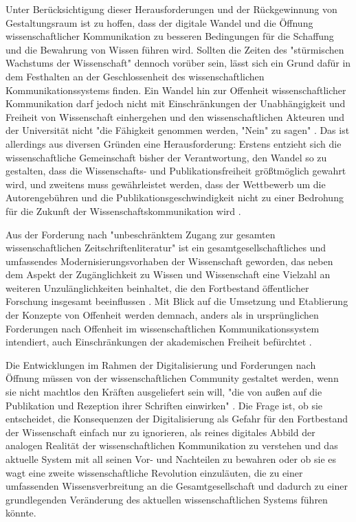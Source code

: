 Unter Berücksichtigung dieser Herausforderungen und der Rückgewinnung von Gestaltungsraum ist zu hoffen, dass der digitale Wandel und die Öffnung wissenschaftlicher Kommunikation zu besseren Bedingungen für die Schaffung und die Bewahrung von Wissen führen wird. Sollten die Zeiten des "stürmischen Wachstums der Wissenschaft" \cite{Koelbel_2002} dennoch vorüber sein, lässt sich ein Grund dafür in dem Festhalten an der Geschlossenheit des wissenschaftlichen Kommunikationssystems finden. Ein Wandel hin zur Offenheit wissenschaftlicher Kommunikation darf jedoch nicht mit Einschränkungen der Unabhängigkeit und Freiheit von Wissenschaft einhergehen und den wissenschaftlichen Akteuren und der Universität nicht "die Fähigkeit genommen werden, "Nein" zu sagen" \cite[:12]{Neidhardt_2006}. Das ist allerdings aus diversen Gründen eine Herausforderung: Erstens entzieht sich die wissenschaftliche Gemeinschaft bisher der Verantwortung, den Wandel so zu gestalten, dass die Wissenschafts- und Publikationsfreiheit größtmöglich gewahrt wird, und zweitens muss gewährleistet werden, dass der Wettbewerb um die Autorengebühren und die Publikationsgeschwindigkeit nicht zu einer Bedrohung für die Zukunft der Wissenschaftskommunikation wird \cite{Beall_2012} \cite{Lossau_2007}.

Aus der Forderung nach "unbeschränktem Zugang zur gesamten wissenschaftlichen Zeitschriftenliteratur" \cite{BOAI_2012} ist ein gesamtgesellschaftliches und umfassendes Modernisierungsvorhaben der Wissenschaft geworden, das neben dem Aspekt der Zugänglichkeit zu Wissen und Wissenschaft eine Vielzahl an weiteren Unzulänglichkeiten beinhaltet, die den Fortbestand öffentlicher Forschung insgesamt beeinflussen \cite{Brembs_2015}. Mit Blick auf die Umsetzung und Etablierung der Konzepte von Offenheit werden demnach, anders als in ursprünglichen Forderungen nach Offenheit im wissenschaftlichen Kommunikationssystem intendiert, auch Einschränkungen der akademischen Freiheit befürchtet \cite{Hagner_2015}.

Die Entwicklungen im Rahmen der Digitalisierung und Forderungen nach Öffnung müssen von der wissenschaftlichen Community gestaltet werden, wenn sie nicht machtlos den Kräften ausgeliefert sein will, "die von außen auf die Publikation und Rezeption ihrer Schriften einwirken" \cite[:6]{Hirschi_2015}. Die Frage ist, ob sie entscheidet, die Konsequenzen der Digitalisierung als Gefahr für den Fortbestand der Wissenschaft einfach nur zu ignorieren, als reines digitales Abbild der analogen Realität der wissenschaftlichen Kommunikation zu verstehen und das aktuelle System mit all seinen Vor- und Nachteilen zu bewahren oder ob sie es wagt eine zweite wissenschaftliche Revolution einzuläuten, die zu einer umfassenden Wissensverbreitung an die Gesamtgesellschaft und dadurch zu einer grundlegenden Veränderung des aktuellen wissenschaftlichen Systems führen könnte.

